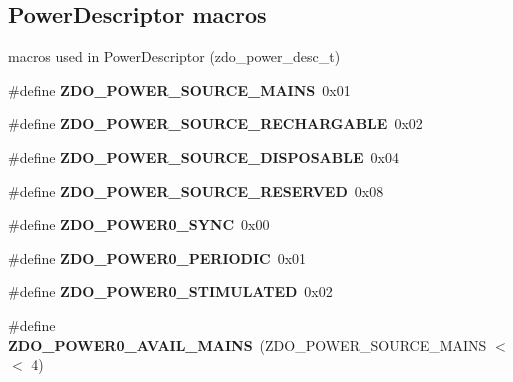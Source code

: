 \subsection*{Power\+Descriptor macros}
\label{_amgrpc8b2f63f47b11b1245f13496e262efc5}%
macros used in Power\+Descriptor (zdo\+\_\+power\+\_\+desc\+\_\+t) \begin{DoxyCompactItemize}
\item 
\mbox{\label{group__zdo_gaf915c94ec813213961b3fc93c4c608ca}} 
\#define {\bfseries Z\+D\+O\+\_\+\+P\+O\+W\+E\+R\+\_\+\+S\+O\+U\+R\+C\+E\+\_\+\+M\+A\+I\+NS}~0x01
\item 
\mbox{\label{group__zdo_ga5096133eec6c50b31fdf5a994c1fc228}} 
\#define {\bfseries Z\+D\+O\+\_\+\+P\+O\+W\+E\+R\+\_\+\+S\+O\+U\+R\+C\+E\+\_\+\+R\+E\+C\+H\+A\+R\+G\+A\+B\+LE}~0x02
\item 
\mbox{\label{group__zdo_ga9ba5e697f3da7fb0488d047676264436}} 
\#define {\bfseries Z\+D\+O\+\_\+\+P\+O\+W\+E\+R\+\_\+\+S\+O\+U\+R\+C\+E\+\_\+\+D\+I\+S\+P\+O\+S\+A\+B\+LE}~0x04
\item 
\mbox{\label{group__zdo_gab21873d088d45d8f3aa0c534fabd824b}} 
\#define {\bfseries Z\+D\+O\+\_\+\+P\+O\+W\+E\+R\+\_\+\+S\+O\+U\+R\+C\+E\+\_\+\+R\+E\+S\+E\+R\+V\+ED}~0x08
\item 
\mbox{\label{group__zdo_ga21506c473239ac9f7fb08bd639581b71}} 
\#define {\bfseries Z\+D\+O\+\_\+\+P\+O\+W\+E\+R0\+\_\+\+S\+Y\+NC}~0x00
\item 
\mbox{\label{group__zdo_ga14c775cfd03dad684f6f080383076764}} 
\#define {\bfseries Z\+D\+O\+\_\+\+P\+O\+W\+E\+R0\+\_\+\+P\+E\+R\+I\+O\+D\+IC}~0x01
\item 
\mbox{\label{group__zdo_ga985110ef15923867842bee91e66e0b1f}} 
\#define {\bfseries Z\+D\+O\+\_\+\+P\+O\+W\+E\+R0\+\_\+\+S\+T\+I\+M\+U\+L\+A\+T\+ED}~0x02
\item 
\mbox{\label{group__zdo_gad07d6e180ee997547235aa5a113296a0}} 
\#define {\bfseries Z\+D\+O\+\_\+\+P\+O\+W\+E\+R0\+\_\+\+A\+V\+A\+I\+L\+\_\+\+M\+A\+I\+NS}~(Z\+D\+O\+\_\+\+P\+O\+W\+E\+R\+\_\+\+S\+O\+U\+R\+C\+E\+\_\+\+M\+A\+I\+NS $<$$<$ 4)
\item 
$$
\end{DoxyCompactItemize}
